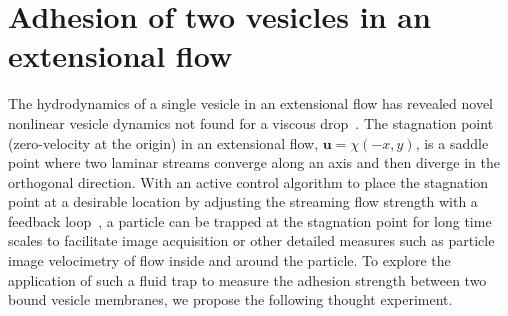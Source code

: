 \documentclass[prf,superscriptaddress,showpacs]{revtex4-1}
\newcommand{\uu}{\mathbf{u}}
\begin{document}
\section{Adhesion of two vesicles in an extensional flow} 
\label{sec:eflow} 
The hydrodynamics of a single vesicle in an extensional flow has
revealed novel nonlinear vesicle dynamics not found for a viscous
drop~\cite{KantslerSegreSteinberg2008_PRL, ZhaoShaqfeh2013_JFM,
Narsimhan2014_JFM, DahlNarsimhanGouveia2016_SoftMatt}.  The stagnation
point (zero-velocity at the origin) in an extensional flow, $\uu =\chi(-x,y)$,
is a saddle point where two laminar streams converge along an axis and
then diverge in the orthogonal direction.  With an active control algorithm
to place the stagnation point at a desirable location by adjusting the streaming
flow strength with a feedback loop~\cite{Johnson-Chavarria2011_EMJ}, a
particle can be trapped at the stagnation point for long time scales to
facilitate image acquisition or other detailed measures such as particle
image velocimetry of flow inside and around the particle.  To explore
the application of such a fluid trap to measure the adhesion strength
between two bound vesicle membranes, we propose the following thought
experiment.
\end{document}
